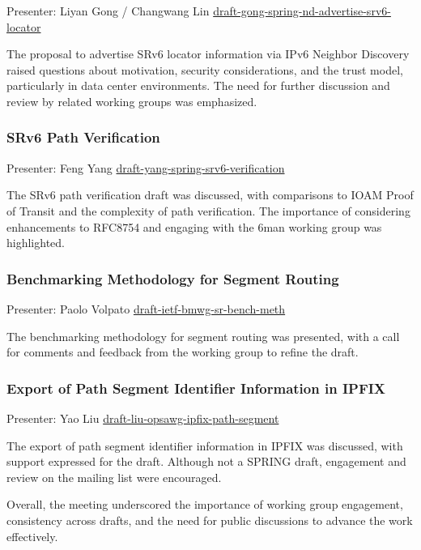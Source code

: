 \documentclass{article}
\begin{document}
Presenter: Liyan Gong / Changwang Lin  
\href{https://datatracker.ietf.org/doc/draft-gong-spring-nd-advertise-srv6-locator/}{draft-gong-spring-nd-advertise-srv6-locator}

The proposal to advertise SRv6 locator information via IPv6 Neighbor Discovery raised questions about motivation, security considerations, and the trust model, particularly in data center environments. The need for further discussion and review by related working groups was emphasized.

\subsubsection{SRv6 Path Verification}

Presenter: Feng Yang  
\href{https://datatracker.ietf.org/doc/draft-yang-spring-srv6-verification/}{draft-yang-spring-srv6-verification}

The SRv6 path verification draft was discussed, with comparisons to IOAM Proof of Transit and the complexity of path verification. The importance of considering enhancements to RFC8754 and engaging with the 6man working group was highlighted.

\subsubsection{Benchmarking Methodology for Segment Routing}

Presenter: Paolo Volpato  
\href{https://datatracker.ietf.org/doc/draft-ietf-bmwg-sr-bench-meth/}{draft-ietf-bmwg-sr-bench-meth}

The benchmarking methodology for segment routing was presented, with a call for comments and feedback from the working group to refine the draft.

\subsubsection{Export of Path Segment Identifier Information in IPFIX}

Presenter: Yao Liu  
\href{https://datatracker.ietf.org/doc/draft-liu-opsawg-ipfix-path-segment/}{draft-liu-opsawg-ipfix-path-segment}

The export of path segment identifier information in IPFIX was discussed, with support expressed for the draft. Although not a SPRING draft, engagement and review on the mailing list were encouraged.

Overall, the meeting underscored the importance of working group engagement, consistency across drafts, and the need for public discussions to advance the work effectively.
\end{document}
